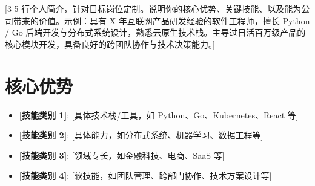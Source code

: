 \documentclass[11pt,a4paper,sans]{moderncv}
\begin{document}
\makecvtitle


\vspace{6pt}
\small{[3-5 行个人简介，针对目标岗位定制。说明你的核心优势、关键技能、以及能为公司带来的价值。示例：具有 X 年互联网产品研发经验的软件工程师，擅长 Python / Go 后端开发与分布式系统设计，熟悉云原生技术栈。主导过日活百万级产品的核心模块开发，具备良好的跨团队协作与技术决策能力。]}


\section{核心优势}
\vspace{1pt}
\begin{itemize}
\item \textbf{[技能类别 1]}: [具体技术栈/工具，如 Python、Go、Kubernetes、React 等]
\item \textbf{[技能类别 2]}: [具体能力，如分布式系统、机器学习、数据工程等]
\item \textbf{[技能类别 3]}: [领域专长，如金融科技、电商、SaaS 等]
\item \textbf{[技能类别 4]}: [软技能，如团队管理、跨部门协作、技术方案设计等]
\end{itemize}

\end{document}
